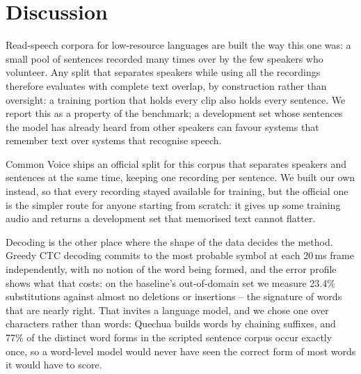 \section{Discussion}
\label{sec:discussion}

Read-speech corpora for low-resource languages are built the way this one was:
a small pool of sentences recorded many times over by the few speakers who
volunteer. Any split that separates speakers while using all the recordings therefore
evaluates with complete text overlap, by construction rather than oversight:
a training portion that holds every clip also holds every sentence. We report
this as a property of the benchmark; a development set whose sentences the model has already heard from other speakers
can favour systems that remember text over systems that recognise speech.

Common Voice ships an official split for this corpus that separates speakers
and sentences at the same time, keeping one recording per sentence. We built
our own instead, so that every recording stayed available for training, but the
official one is the simpler route for anyone starting from scratch: it gives up
some training audio and returns a development set that memorised text cannot
flatter.

Decoding is the other place where the shape of the data decides the method.
Greedy CTC decoding commits to the most probable symbol at each 20\,ms frame
independently, with no notion of the word being formed, and the error profile
shows what that costs: on the baseline's out-of-domain set we measure 23.4\%
substitutions against almost no deletions or insertions -- the signature of
words that are nearly right. That invites a language model, and we chose one over
characters rather than words: Quechua builds words by chaining suffixes, and
77\% of the distinct word forms in the scripted sentence corpus occur exactly
once, so a word-level model would never have seen the correct form of most
words it would have to score.

